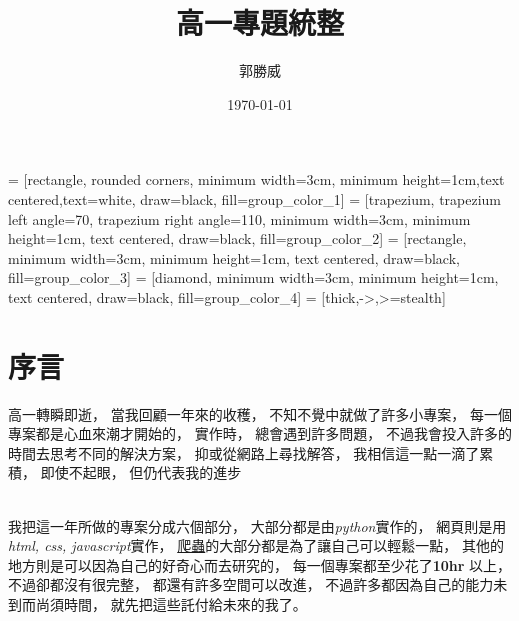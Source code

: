 \documentclass[12pt]{ctexart}
\title{ 高一專題統整 }
\author{ 郭勝威 }
\date{ \today }
\begin{document}

 = [rectangle, rounded corners, minimum width=3cm, minimum height=1cm,text centered,text=white, draw=black, fill=group_color_1]
 = [trapezium, trapezium left angle=70, trapezium right angle=110, minimum width=3cm, minimum height=1cm, text centered, draw=black, fill=group_color_2]
 = [rectangle, minimum width=3cm, minimum height=1cm, text centered, draw=black, fill=group_color_3]
 = [diamond, minimum width=3cm, minimum height=1cm, text centered, draw=black, fill=group_color_4]
 = [thick,->,>=stealth]



\pagestyle{empty}
\maketitle

\thispagestyle{empty}


\clearpage
\tableofcontents

\pagestyle{plain}
\setcounter{page}{0}

\clearpage
\section{ 序言 }

高一轉瞬即逝， 
當我回顧一年來的收穫，
不知不覺中就做了許多小專案，
每一個專案都是心血來潮才開始的，
實作時，
總會遇到許多問題，
不過我會投入許多的時間去思考不同的解決方案，
抑或從網路上尋找解答，
我相信這一點一滴了累積，
即使不起眼，
但仍代表我的進步

\hspace*{\fill}\\

我把這一年所做的專案分成六個部分，
大部分都是由\textit{python}實作的，
網頁則是用\textit{html, css, javascript}實作，
\hyperref[sec::crawler]{爬蟲}的大部分都是為了讓自己可以輕鬆一點，
其他的地方則是可以因為自己的好奇心而去研究的，
每一個專案都至少花了\textbf{10hr} 以上，
不過卻都沒有很完整，
都還有許多空間可以改進，
不過許多都因為自己的能力未到而尚須時間，
就先把這些託付給未來的我了。
\end{document}
